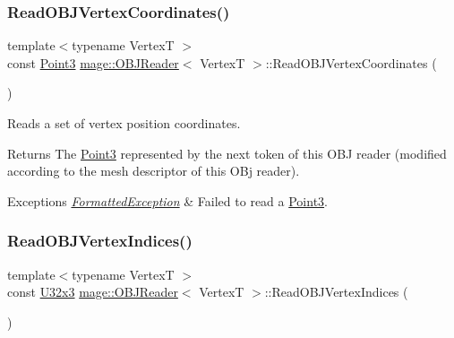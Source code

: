 \subsubsection{\texorpdfstring{Read\+O\+B\+J\+Vertex\+Coordinates()}{ReadOBJVertexCoordinates()}}
{\footnotesize\ttfamily template$<$typename VertexT $>$ \\
const \hyperlink{structmage_1_1_point3}{Point3} \hyperlink{classmage_1_1_o_b_j_reader}{mage\+::\+O\+B\+J\+Reader}$<$ VertexT $>$\+::Read\+O\+B\+J\+Vertex\+Coordinates (\begin{DoxyParamCaption}{ }\end{DoxyParamCaption})\hspace{0.3cm}{\ttfamily [private]}}

Reads a set of vertex position coordinates.

\begin{DoxyReturn}{Returns}
The {\ttfamily \hyperlink{structmage_1_1_point3}{Point3}} represented by the next token of this O\+BJ reader (modified according to the mesh descriptor of this O\+Bj reader). 
\end{DoxyReturn}

\begin{DoxyExceptions}{Exceptions}
{\em \hyperlink{classmage_1_1_formatted_exception}{Formatted\+Exception}} & Failed to read a {\ttfamily \hyperlink{structmage_1_1_point3}{Point3}}. \\
\hline
\end{DoxyExceptions}
\hypertarget{classmage_1_1_o_b_j_reader_ae54af1156c89f3de4ff178b4f51f2081}{}\label{classmage_1_1_o_b_j_reader_ae54af1156c89f3de4ff178b4f51f2081} 
\subsubsection{\texorpdfstring{Read\+O\+B\+J\+Vertex\+Indices()}{ReadOBJVertexIndices()}}
{\footnotesize\ttfamily template$<$typename VertexT $>$ \\
const \hyperlink{namespacemage_ab3633c193f686845fcf80ce95d18a20b}{U32x3} \hyperlink{classmage_1_1_o_b_j_reader}{mage\+::\+O\+B\+J\+Reader}$<$ VertexT $>$\+::Read\+O\+B\+J\+Vertex\+Indices (\begin{DoxyParamCaption}{ }\end{DoxyParamCaption})\hspace{0.3cm}{\ttfamily [private]}}

